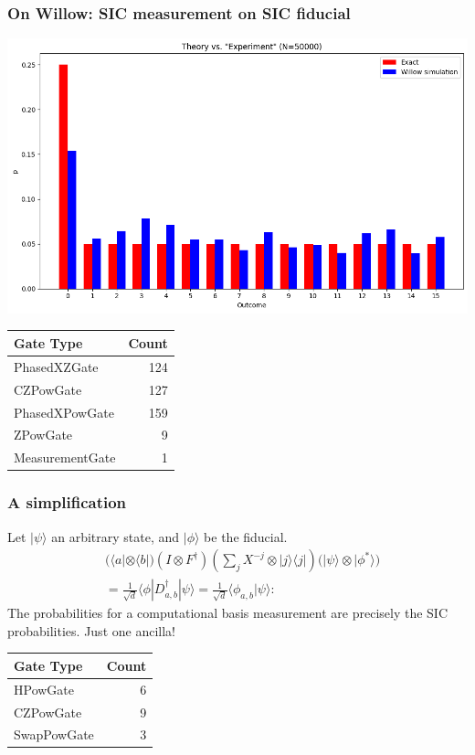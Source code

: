 \documentclass{beamer}
\begin{document}
\begin{frame}
\frametitle{On Willow: SIC measurement on SIC fiducial}
\begin{center}
\includegraphics[scale=0.34]{img/willow_sim.png}	
\end{center}

\begin{tiny}
\begin{table}[h!]
\centering
\begin{tabular}{lr}
\toprule
\textbf{Gate Type} & \textbf{Count} \\
\midrule
PhasedXZGate    & 124 \\
CZPowGate       & 127 \\
PhasedXPowGate  & 159 \\
ZPowGate        & 9 \\
MeasurementGate & 1 \\
\bottomrule
\end{tabular}
\label{tab:circuit_gate_counts}
\end{table}
\end{tiny}
\end{frame}

\begin{frame}
	\frametitle{A simplification}
Let  $|\psi\rangle$ an arbitrary state, and $|\phi\rangle$ be the fiducial.
\begin{align}
&\Big(\langle a| \otimes \langle b|\Big)(I\otimes F^\dagger)\left(\sum_j X^{-j}\otimes |j\rangle\langle j|\right)\Big(|\psi\rangle \otimes |\phi^*\rangle	\Big)\nonumber\\
&=\frac{1}{\sqrt{d}}\langle \phi |D_{a,b}^\dagger |\psi\rangle=\frac{1}{\sqrt{d}}\langle \phi_{a,b}|\psi\rangle:
\end{align}
The probabilities for a computational basis measurement are precisely the SIC probabilities. Just one ancilla!
\begin{table}[h!]
\centering
\begin{tabular}{lr}
\toprule
\textbf{Gate Type} & \textbf{Count} \\
\midrule
HPowGate    & 6 \\
CZPowGate   & 9 \\
SwapPowGate & 3 \\
\bottomrule
\end{tabular}
\label{tab:gate_counts_3}
\end{table}
\end{frame}
\end{document}
